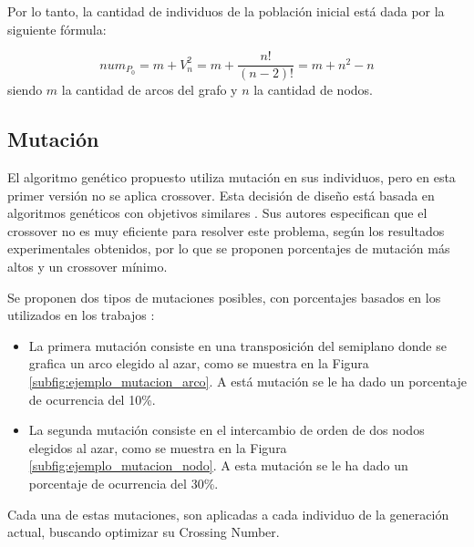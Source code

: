 	
	Por lo tanto, la cantidad de individuos de la población inicial está dada por la siguiente fórmula:
	
	$$num_{P_0} = m+V^2_n= m+ \frac{n!}{(n-2)!}=m+n^2-n $$siendo $m$ la cantidad de arcos del grafo y $n$ la cantidad de nodos.
	
	\subsection{Mutación}
	\label{subsec:mutacion}
	El algoritmo  genético propuesto utiliza   mutación en sus individuos, pero en esta primer versión  no se aplica crossover. Esta decisión de  diseño está basada en 
	algoritmos genéticos  con  objetivos similares \cite{he2007parallelisation, eloranta2001timga}. Sus autores especifican que  el crossover no es muy eficiente para resolver este problema, según los resultados experimentales obtenidos, por lo que se proponen porcentajes de mutación más altos y un crossover mínimo.
	
	Se proponen dos tipos de mutaciones posibles, con porcentajes basados en los utilizados en los trabajos \cite{he2007parallelisation, eloranta2001timga}:
	
	\begin{itemize}
		\item La primera mutación consiste en una transposición del  semiplano donde se grafica  un arco elegido al azar, como se muestra en la Figura \ref{subfig:ejemplo_mutacion_arco}. A está mutación se le ha dado un porcentaje de ocurrencia del 10\%.
		\item La segunda mutación consiste en el intercambio de orden de dos nodos elegidos al azar, como se muestra en la Figura \ref{subfig:ejemplo_mutacion_nodo}. A esta mutación se le ha dado un porcentaje de ocurrencia del 30\%.
	\end{itemize}
	
	Cada una de estas mutaciones,  son aplicadas a  cada individuo de la generación actual, buscando optimizar su Crossing Number.
	
